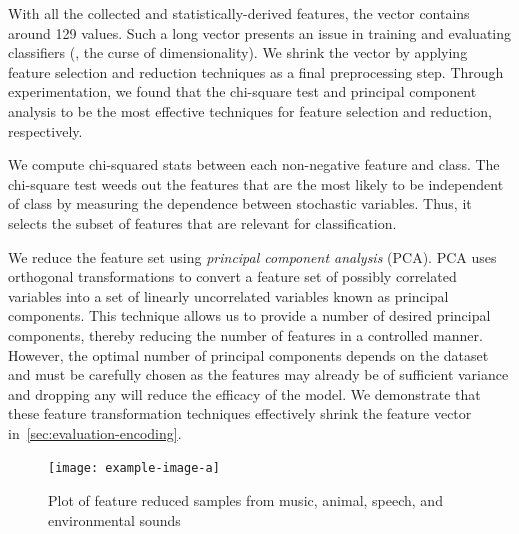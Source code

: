 With all the collected and statistically-derived features, the vector contains
around 129 values.
%
Such a long vector presents an issue in training and evaluating classifiers
(\ie, the curse of dimensionality).
%
We shrink the vector by applying feature selection and reduction techniques as 
a final preprocessing step.
%
Through experimentation, we found that the chi-square test and principal
component analysis to be the most effective techniques for feature selection and
reduction, respectively.

%
We compute chi-squared stats between each non-negative feature and class.
% 
The chi-square test weeds out the features that are the most likely to be
independent of class by measuring the dependence between stochastic variables.
%
Thus, it selects the subset of features that are relevant for classification.

%
We reduce the feature set using \textit{principal component analysis} (PCA).
%
PCA uses orthogonal transformations to convert a feature set of 
possibly correlated variables into a set of linearly uncorrelated variables
known as principal components. 
%
This technique allows us to provide a number of desired principal components,
thereby reducing the number of features in a controlled manner. 
%
However, the optimal number of principal components depends on the dataset 
and must be carefully chosen as the features may already be of sufficient
variance and dropping any will reduce the efficacy of the model. 
%
%
We demonstrate that these feature transformation techniques effectively
shrink the feature vector in~\cref{sec:evaluation-encoding}.

\begin{figure}[t]
    \centering
    \texttt{[image: example-image-a]}
    \caption{Plot of feature reduced samples from music, animal, speech, and environmental sounds}
    \label{fig:top-dist}
\end{figure}
